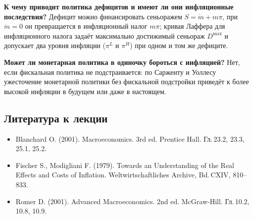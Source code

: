 \documentclass[11pt,a4paper]{article}
\begin{document}
\textbf{К чему приводит политика дефицитов и имеют ли они инфляционные последствия?} Дефицит можно финансировать сеньоражем $S=\dot m+m\pi$, при $\dot m=0$ он превращается в инфляционный налог $m\pi$; кривая Лаффера для инфляционного налога задаёт максимально достижимый сеньораж $D^{\max}$ и допускает два уровня инфляции ($\pi^L$ и $\pi^H$) при одном и том же дефиците.

\textbf{Может ли монетарная политика в одиночку бороться с инфляцией?} Нет, если фискальная политика не подстраивается: по Сарженту и Уоллесу ужесточение монетарной политики без фискальной подстройки приведёт к более высокой инфляции в будущем или даже в настоящем.

\subsection*{Литература к лекции}
\begin{itemize}[leftmargin=1.5em]
\item Blanchard O. (2001). Macroeconomics. 3rd ed. Prentice Hall. Гл.\,23.2, 23.3, 25.1, 25.2.
\item Fischer S., Modigliani F. (1979). Towards an Understanding of the Real Effects and Costs of Inflation. Weltwirtschaftliches Archive, Bd.\,CXIV, 810--833.
\item Romer D. (2001). Advanced Macroeconomics. 2nd ed. McGraw-Hill. Гл.\,10.2, 10.8, 10.9.
\end{itemize}
\end{document}
